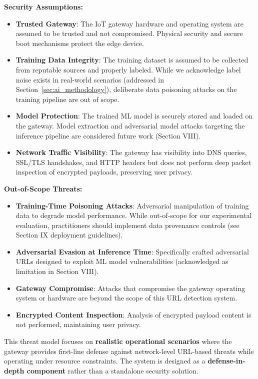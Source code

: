 \documentclass[conference]{IEEEtran}
\begin{document}
\textbf{Security Assumptions:}
\begin{itemize}
\item \textbf{Trusted Gateway}: The IoT gateway hardware and operating system are assumed to be trusted and not compromised. Physical security and secure boot mechanisms protect the edge device.
\item \textbf{Training Data Integrity}: The training dataset is assumed to be collected from reputable sources and properly labeled. While we acknowledge label noise exists in real-world scenarios (addressed in Section~\ref{sec:ai_methodology}), deliberate data poisoning attacks on the training pipeline are out of scope.
\item \textbf{Model Protection}: The trained ML model is securely stored and loaded on the gateway. Model extraction and adversarial model attacks targeting the inference pipeline are considered future work (Section VIII).
\item \textbf{Network Traffic Visibility}: The gateway has visibility into DNS queries, SSL/TLS handshakes, and HTTP headers but does not perform deep packet inspection of encrypted payloads, preserving user privacy.
\end{itemize}

\textbf{Out-of-Scope Threats:}
\begin{itemize}
\item \textbf{Training-Time Poisoning Attacks}: Adversarial manipulation of training data to degrade model performance. While out-of-scope for our experimental evaluation, practitioners should implement data provenance controls (see Section IX deployment guidelines).
\item \textbf{Adversarial Evasion at Inference Time}: Specifically crafted adversarial URLs designed to exploit ML model vulnerabilities (acknowledged as limitation in Section VIII).
\item \textbf{Gateway Compromise}: Attacks that compromise the gateway operating system or hardware are beyond the scope of this URL detection system.
\item \textbf{Encrypted Content Inspection}: Analysis of encrypted payload content is not performed, maintaining user privacy.
\end{itemize}

This threat model focuses on \textbf{realistic operational scenarios} where the gateway provides first-line defense against network-level URL-based threats while operating under resource constraints. The system is designed as a \textbf{defense-in-depth component} rather than a standalone security solution.
\end{document}
